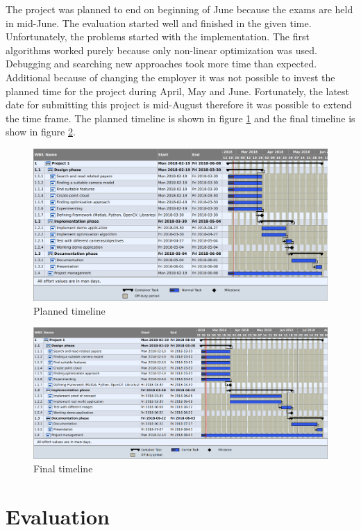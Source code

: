 \documentclass[11pt,a4paper,titlepage,oneside]{report}
\begin{document}
The project was planned to end on beginning of June because the exams are held in mid-June. The evaluation started well and finished in the given time. Unfortunately, the problems started with the implementation. The first algorithms worked purely because only non-linear optimization was used. Debugging and searching new approaches took more time than expected. Additional because of changing the employer it was not possible to invest the planned time for the project during April, May and June. Fortunately, the latest date for submitting this project is mid-August therefore it was possible to extend the time frame. The planned timeline is shown in figure \ref{fig:timeline_should} and the final timeline is show in figure \ref{fig:timeline_is}.
\begin{figure}[H]
	\includegraphics[width=1.0\textwidth]{img/timeline_should.png}
	\caption{Planned timeline}\label{fig:timeline_should}
\end{figure}

\begin{figure}[H]
	\includegraphics[width=1.0\textwidth]{img/timeline_is.png}
	\caption{Final timeline}\label{fig:timeline_is}
\end{figure}


\chapter{Evaluation}
\end{document}
